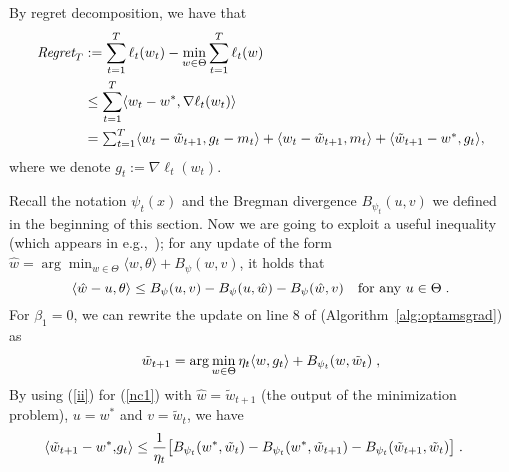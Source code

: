 \documentclass[11pt]{article}
\makeatletter
\renewenvironment{proof}[1][\proofname]{%
   \par\pushQED{\qed}\normalfont%
   \topsep6\p@\@plus6\p@\relax
   \trivlist\item[\hskip\labelsep\bfseries#1]%
   \ignorespaces
}{%
   \popQED\endtrivlist\@endpefalse
}
\theoremstyle{k}
\makeatother
\begin{document}
\begin{proof}
By regret decomposition, we have that
\begin{equation} \label{nn1}
\begin{aligned}
 \text{\it Regret}_T  & := \sum_{t=1}^T \ell_t(w_t) - \min_{w \in \Theta} \sum_{t=1}^T \ell_t(w)  \textstyle  \\
 & \leq \sum_{t=1}^T  \langle w_t - w^*, \nabla \ell_t(w_t) \rangle
\\ & \textstyle = \sum_{t=1}^T \langle  w_t - \tilde{w}_{t+1} , g_t - m_t \rangle + \langle w_t - \tilde{w}_{t+1}, m_t \rangle + \langle \tilde{w}_{t+1} - w^*, g_t  \rangle,
\end{aligned}
\end{equation}
where we denote $g_t:=\nabla \ell_t(w_t)$.


Recall the notation $\psi_t(x)$ and the Bregman divergence $B_{\psi_t}(u,v)$
we defined in the beginning of this section.
Now we are going to exploit a useful inequality (which appears in e.g.,~\cite{T08}); for any update of the form $\hat{w} = \arg\min_{w \in \Theta} \langle w, \theta \rangle + B_{\psi}(w, v)$, it holds that
\begin{equation} \label{ii}
\langle \hat{w} - u, \theta \rangle \leq B_{\psi}( u, v ) - B_{\psi}( u, \hat{w}) - B_{\psi}( \hat{w}, v) \quad \textrm{for any $u \in \Theta$} \;.
\end{equation}
For $\beta_1=0$, we can rewrite the update on line 8 of (Algorithm~\ref{alg:optamsgrad}) as
\begin{equation} \label{nc1}
\tilde{w}_{t+1}= \arg\min_{w \in \Theta} \eta_t \langle w, g_t \rangle + B_{\psi_t}(w, \tilde{w}_{t} ) \;,
\end{equation}
By using (\ref{ii}) for (\ref{nc1}) with $\hat{w} = \tilde{w}_{t+1}$ (the output of the minimization problem), $u = w^*$ and $v = \tilde{w}_{t}$, we have
\begin{equation} \label{nn2}
\begin{aligned}
 \langle \tilde{w}_{t+1} - w^*, & g_t \rangle \leq \frac{1}{\eta_t}\big[ B_{\psi_t}( w^*, \tilde{w}_{t}) -B_{\psi_t}(w^*,  \tilde{w}_{t+1} ) - B_{\psi_t}(\tilde{w}_{t+1}, \tilde{w}_{t}) \big] \;.
\end{aligned}
\end{equation}


\end{proof}
\end{document}
